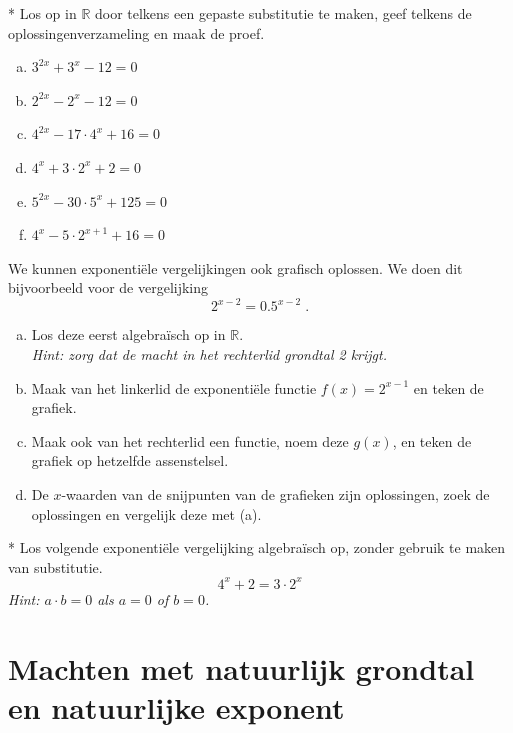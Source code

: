 \documentclass[12pt,twoside]{article}
\begin{document}
\begin{oefening}*
Los op in $\mathbb{R}$ door telkens een gepaste substitutie te maken, geef telkens de oplossingenverzameling en maak de proef.
\begin{multicols}{2}
\begin{enumerate}[(a)]
  \item $3^{2x}+3^x-12=0$
  \item $2^{2x}-2^x-12=0$
  \item $4^{2x}-17\cdot 4^x + 16=0$
  \item $4^x+3\cdot 2^x+2=0$
  \item $5^{2x}-30\cdot 5^x+125=0$
  \item $4^x-5\cdot 2^{x+1}+16=0$
\end{enumerate}
\end{multicols}
\end{oefening}

\begin{oefening}
We kunnen exponentiële vergelijkingen ook grafisch oplossen. We doen dit bijvoorbeeld voor de vergelijking
$$2^{x-2}=0.5^{x-2}\;.$$
\begin{enumerate}[(a)]
  \item Los deze eerst algebraïsch op in $\mathbb{R}$.\\
        {\em Hint: zorg dat de macht in het rechterlid grondtal 2 krijgt.}
  \item Maak van het linkerlid de exponentiële functie $f(x)=2^{x-1}$ en teken de grafiek.
  \item Maak ook van het rechterlid een functie, noem deze $g(x)$, en teken de grafiek op hetzelfde assenstelsel.
  \item De $x$-waarden van de snijpunten van de grafieken zijn oplossingen, zoek de oplossingen en vergelijk deze met (a).
\end{enumerate}
\end{oefening}

\begin{oefening}*
Los volgende exponentiële vergelijking algebraïsch op, zonder gebruik te maken van substitutie.
$$4^x+2=3\cdot2^x$$
{\em Hint: $a\cdot b=0$ als $a=0$ of $b=0$.}
\end{oefening}

\pagebreak
\appendix
\section{Machten met natuurlijk grondtal en natuurlijke exponent}
\end{document}
